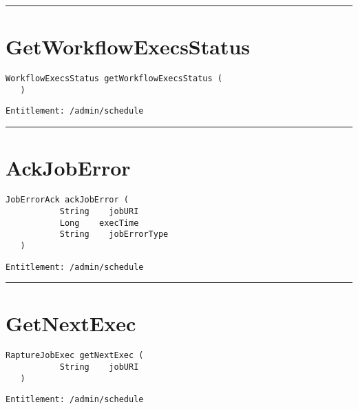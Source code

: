 \rule{12cm}{2pt}
\section{GetWorkflowExecsStatus}
\label{Api:GetWorkflowExecsStatus}
\begin{lstlisting}[style=nonumbers]
   WorkflowExecsStatus getWorkflowExecsStatus (
   )
\end{lstlisting}
\begin{Verbatim}[formatcom=\color{Maroon}]
  Entitlement: /admin/schedule
\end{Verbatim}



\rule{12cm}{2pt}
\section{AckJobError}
\label{Api:AckJobError}
\begin{lstlisting}[style=nonumbers]
   JobErrorAck ackJobError (
           String    jobURI
           Long    execTime
           String    jobErrorType
   )
\end{lstlisting}
\begin{Verbatim}[formatcom=\color{Maroon}]
  Entitlement: /admin/schedule
\end{Verbatim}



\rule{12cm}{2pt}
\section{GetNextExec}
\label{Api:GetNextExec}
\begin{lstlisting}[style=nonumbers]
   RaptureJobExec getNextExec (
           String    jobURI
   )
\end{lstlisting}
\begin{Verbatim}[formatcom=\color{Maroon}]
  Entitlement: /admin/schedule
\end{Verbatim}




